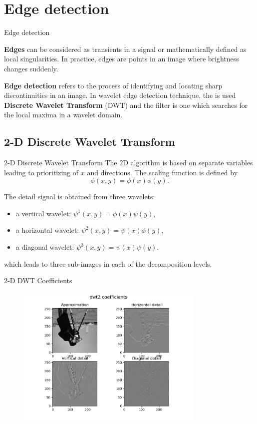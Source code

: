 \documentclass{beamer}
\newcommand{\1}[1]{\mathds{1}\left(#1\right)}
\begin{document}
\section{Edge detection}
\begin{frame}{Edge detection}
\begin{block}{}
	\textbf{Edges} can be considered as transients in a signal or mathematically defined as local singularities. 
	In practice, edges are points in an image where brightness changes suddenly.
\end{block}
	
\begin{block}{}
	\textbf{Edge detection} refers to the process of identifying and locating sharp
	discontinuities in an image. In wavelet edge detection technique, the is used \textbf{Discrete Wavelet Transform} (DWT) and the filter is one which searches for the local maxima in a wavelet domain.
\end{block}
\end{frame}

\subsection{2-D Discrete Wavelet Transform}
\begin{frame}{2-D Discrete Wavelet Transform}
The 2D algorithm is based on separate variables leading to prioritizing of $x$ and
directions. The scaling function is defined by
$$
\phi(x, y) = \phi(x) \phi(y).
$$

The detail signal is obtained from three wavelets:
\begin{itemize}
	\item a vertical wavelet: $\psi^1(x, y) =\phi(x)\psi(y)$,
	\item a horizontal wavelet: $\psi^2(x, y) = \psi(x) \phi(y)$,
	\item a diagonal wavelet: $\psi^3(x, y) = \psi(x) \psi(y)$.
\end{itemize}
which leads to three sub-images in each of the decomposition levels.
\end{frame}

\begin{frame}{2-D DWT Coefficients}
	\begin{figure}[p]
	\centering
	\includegraphics[width=0.8\textwidth]{dwt2_coefficients.png}
\end{figure}
\end{frame}
\end{document}
